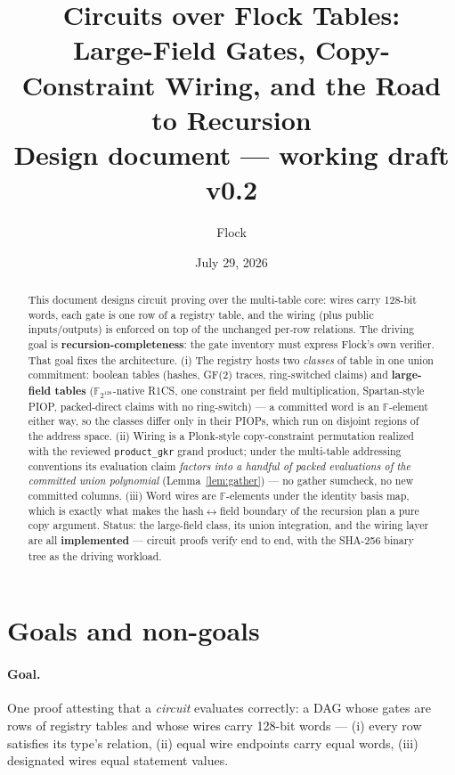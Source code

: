 \documentclass[11pt]{article}
\title{Circuits over Flock Tables:\\ Large-Field Gates, Copy-Constraint Wiring, and the Road to Recursion\\[0.6ex]
\large Design document --- working draft v0.2}
\author{Flock}
\date{July 29, 2026}
\newcommand{\F}{\mathbb{F}}
\newcommand{\code}[1]{\texttt{#1}}
\theoremstyle{definition}
\begin{document}
\maketitle

\begin{abstract}
This document designs circuit proving over the multi-table core: wires
carry 128-bit words, each gate is one row of a registry table, and the
wiring (plus public inputs/outputs) is enforced on top of the unchanged
per-row relations. The driving goal is \textbf{recursion-completeness}: the
gate inventory must express Flock's own verifier. That goal fixes the
architecture. (i) The registry hosts two \emph{classes} of table in one
union commitment: boolean tables (hashes, GF(2) traces, ring-switched
claims) and \textbf{large-field tables} ($\F_{2^{128}}$-native R1CS, one
constraint per field multiplication, Spartan-style PIOP, packed-direct
claims with no ring-switch) --- a committed word is an $\F$-element either
way, so the classes differ only in their PIOPs, which run on disjoint
regions of the address space. (ii) Wiring is a Plonk-style copy-constraint
permutation realized with the reviewed \code{product\_gkr} grand product;
under the multi-table addressing conventions its evaluation claim
\emph{factors into a handful of packed evaluations of the committed union
polynomial} (Lemma~\ref{lem:gather}) --- no gather sumcheck, no new
committed columns. (iii) Word wires are $\F$-elements under the identity
basis map, which is exactly what makes the hash$\leftrightarrow$field
boundary of the recursion plan a pure copy argument. Status: the
large-field class, its union integration, and the wiring layer are all
\textbf{implemented} --- circuit proofs verify end to end, with the
SHA-256 binary tree as the driving workload.
\end{abstract}

\tableofcontents

\section{Goals and non-goals}\label{sec:goals}

\paragraph{Goal.} One proof attesting that a \emph{circuit} evaluates
correctly: a DAG whose gates are rows of registry tables and whose wires
carry 128-bit words --- (i) every row satisfies its type's relation, (ii)
equal wire endpoints carry equal words, (iii) designated wires equal
statement values.
\end{document}

